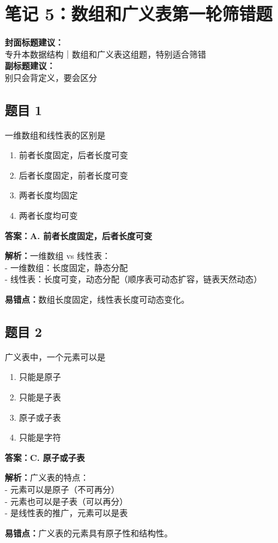 \documentclass[12pt,a4paper]{ctexart}
\begin{document}
\newpage

\section{笔记 5：数组和广义表第一轮筛错题}
\begin{coverbox}
	\textbf{封面标题建议：}\\
	专升本数据结构｜数组和广义表这组题，特别适合筛错\\
	\textbf{副标题建议：}\\
	别只会背定义，要会区分
\end{coverbox}

\subsection*{题目 1}
一维数组和线性表的区别是
\begin{enumerate}[label=\Alph*.]
	\item 前者长度固定，后者长度可变
	\item 后者长度固定，前者长度可变
	\item 两者长度均固定
	\item 两者长度均可变
\end{enumerate}

\begin{answerbox}
	\textbf{答案：A. 前者长度固定，后者长度可变}

	\textbf{解析：}一维数组 vs 线性表：\\
	- 一维数组：长度固定，静态分配\\
	- 线性表：长度可变，动态分配（顺序表可动态扩容，链表天然动态）

	\textbf{易错点：}数组长度固定，线性表长度可动态变化。
\end{answerbox}

\subsection*{题目 2}
广义表中，一个元素可以是
\begin{enumerate}[label=\Alph*.]
	\item 只能是原子
	\item 只能是子表
	\item 原子或子表
	\item 只能是字符
\end{enumerate}

\begin{answerbox}
	\textbf{答案：C. 原子或子表}

	\textbf{解析：}广义表的特点：\\
	- 元素可以是原子（不可再分）\\
	- 元素也可以是子表（可以再分）\\
	- 是线性表的推广，元素可以是表

	\textbf{易错点：}广义表的元素具有原子性和结构性。
\end{answerbox}
\end{document}
